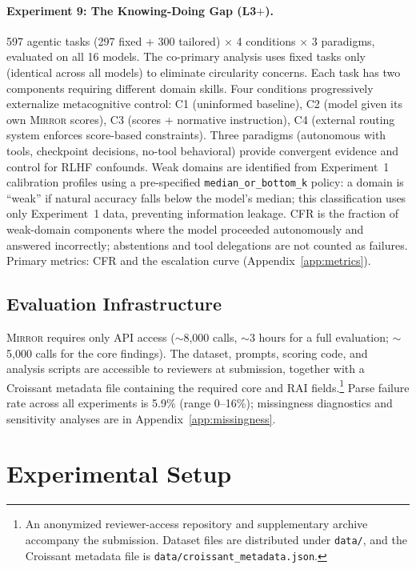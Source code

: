 \documentclass[10pt]{article}
\newcommand{\mirror}{\textsc{Mirror}}
\newcommand{\CFR}{CFR}
\begin{document}
\paragraph{Experiment 9: The Knowing-Doing Gap (L3$+$).}
597 agentic tasks (297 fixed + 300 tailored) $\times$ 4 conditions $\times$ 3 paradigms, evaluated on all 16 models. The co-primary analysis uses fixed tasks only (identical across all models) to eliminate circularity concerns. Each task has two components requiring different domain skills. Four conditions progressively externalize metacognitive control: C1 (uninformed baseline), C2 (model given its own \mirror{} scores), C3 (scores + normative instruction), C4 (external routing system enforces score-based constraints). Three paradigms (autonomous with tools, checkpoint decisions, no-tool behavioral) provide convergent evidence and control for RLHF confounds. Weak domains are identified from Experiment~1 calibration profiles using a pre-specified \texttt{median\_or\_bottom\_k} policy: a domain is ``weak'' if natural accuracy falls below the model's median; this classification uses only Experiment~1 data, preventing information leakage. \CFR{} is the fraction of weak-domain components where the model proceeded autonomously and answered incorrectly; abstentions and tool delegations are not counted as failures. Primary metrics: \CFR{} and the escalation curve (Appendix~\ref{app:metrics}).

\subsection{Evaluation Infrastructure}

\mirror{} requires only API access ($\sim$8,000 calls, $\sim$3 hours for a full evaluation; $\sim$5,000 calls for the core findings). The dataset, prompts, scoring code, and analysis scripts are accessible to reviewers at submission, together with a Croissant metadata file containing the required core and RAI fields.\footnote{An anonymized reviewer-access repository and supplementary archive accompany the submission. Dataset files are distributed under \texttt{data/}, and the Croissant metadata file is \texttt{data/croissant\_metadata.json}.} Parse failure rate across all experiments is 5.9\% (range 0--16\%); missingness diagnostics and sensitivity analyses are in Appendix~\ref{app:missingness}.

\section{Experimental Setup}
\label{sec:setup}
\end{document}
